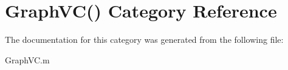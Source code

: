 \hypertarget{category_graph_v_c_07_08}{\section{Graph\-V\-C() Category Reference}
\label{category_graph_v_c_07_08}
}


The documentation for this category was generated from the following file\-:\begin{DoxyCompactItemize}
\item 
Graph\-V\-C.\-m\end{DoxyCompactItemize}
